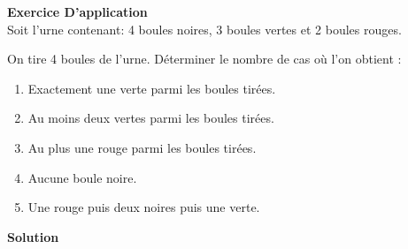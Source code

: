 \documentclass[12pt,a4paper]{article}
\begin{document}
\tiny

\textbf{Exercice D'application} \\[2pt]

Soit l'urne contenant: 4 boules noires, 3 boules vertes et 2 boules rouges.


On tire 4 boules de l'urne. Déterminer le nombre de cas où l'on obtient :

\begin{enumerate}
    \item Exactement une verte parmi les boules tirées.
    \item Au moins deux vertes parmi les boules tirées.
    \item Au plus une rouge parmi les boules tirées.
    \item Aucune boule noire.
    \item Une rouge puis deux noires puis une verte.
\end{enumerate}

\textbf{Solution} \\[2pt]

\renewcommand{\arraystretch}{2} %
\end{document}
